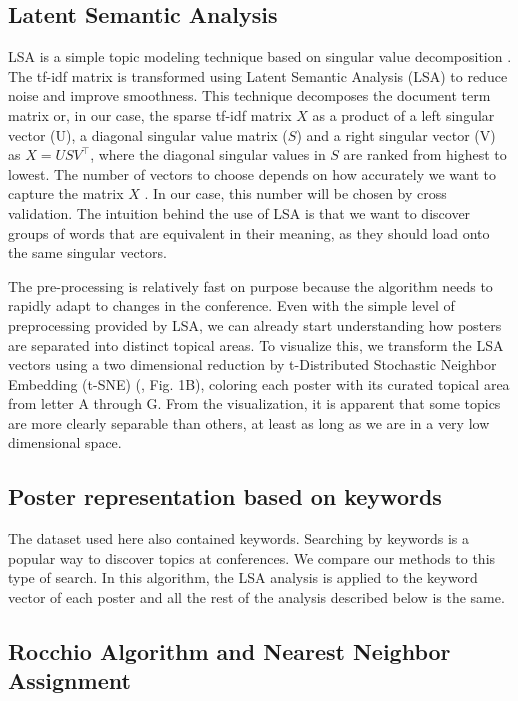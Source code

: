 \documentclass[a4paper]{article}
\begin{document}
\subsection{Latent Semantic Analysis}

LSA is a simple topic modeling technique based on singular value decomposition \cite{landauer1998introduction}. The tf-idf matrix is transformed using Latent Semantic Analysis (LSA) to reduce noise and improve smoothness. This technique decomposes the document term matrix or, in our case, the sparse tf-idf matrix $X$ as a product of a left singular vector (U), a diagonal singular value matrix ($S$) and a right singular vector (V) as $X = USV^\top$, where the diagonal singular values in $S$ are ranked from highest to lowest. The number of vectors to choose depends on how accurately we want to capture the matrix $X$ \cite{bishop2006pattern}. In our case, this number will be chosen by cross validation. The intuition behind the use of LSA is that we want to discover groups of words that are equivalent in their meaning, as they should load onto the same singular vectors.


The pre-processing is relatively fast on purpose because the algorithm needs to rapidly adapt to changes in the conference. Even with the simple level of preprocessing provided by LSA, we can already start understanding how posters are separated into distinct topical areas. To visualize this, we transform the LSA vectors using a two dimensional reduction by t-Distributed Stochastic Neighbor Embedding (t-SNE) (\cite{van2008visualizing}, Fig. 1B), coloring each poster with its curated topical area from letter A through G. From the visualization, it is apparent that some topics are more clearly separable than others, at least as long as we are in a very low dimensional space.

\subsection{Poster representation based on keywords}

The dataset used here also contained keywords. Searching by keywords is a popular way to discover topics at conferences. We compare our methods to this type of search. In this algorithm, the LSA analysis is applied to the keyword vector of each poster and all the rest of the analysis described below is the same.


\subsection{Rocchio Algorithm and Nearest Neighbor Assignment}
\end{document}
